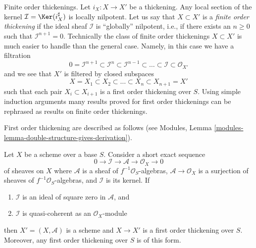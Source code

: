 \noindent
Finite order thickenings. Let $i_X : X \to X'$ be a thickening.
Any local section of the kernel
$\mathcal{I} = \Ker(i_X^\sharp)$ is locally nilpotent.
Let us say that $X \subset X'$ is a {\it finite order thickening}
if the ideal sheaf $\mathcal{I}$ is ``globally'' nilpotent, i.e.,
if there exists an $n \geq 0$ such that $\mathcal{I}^{n + 1} = 0$.
Technically the class of finite order thickenings $X \subset X'$
is much easier to handle than the general case.
Namely, in this case we have a filtration
$$
0 = \mathcal{I}^{n + 1} \subset
\mathcal{I}^n \subset
\mathcal{I}^{n - 1} \subset \ldots \subset
\mathcal{I} \subset \mathcal{O}_{X'}
$$
and we see that $X'$ is filtered by closed subspaces
$$
X = X_1 \subset X_2 \subset \ldots \subset X_n \subset X_{n + 1} = X'
$$
such that each pair $X_i \subset X_{i + 1}$ is a first order thickening
over $S$. Using simple induction arguments many results proved for first order
thickenings can be rephrased as results on finite order thickenings.

\medskip\noindent
First order thickening are described as follows (see
Modules, Lemma \ref{modules-lemma-double-structure-gives-derivation}).

\begin{lemma}
\label{lemma-first-order-thickening}
Let $X$ be a scheme over a base $S$. Consider a short exact sequence
$$
0 \to \mathcal{I} \to \mathcal{A} \to \mathcal{O}_X \to 0
$$
of sheaves on $X$ where $\mathcal{A}$ is a sheaf of
$f^{-1}\mathcal{O}_S$-algebras,
$\mathcal{A} \to \mathcal{O}_X$ is a surjection
of sheaves of $f^{-1}\mathcal{O}_S$-algebras, and $\mathcal{I}$ is its kernel.
If
\begin{enumerate}
\item $\mathcal{I}$ is an ideal of square zero in $\mathcal{A}$, and
\item $\mathcal{I}$ is quasi-coherent as an $\mathcal{O}_X$-module
\end{enumerate}
then $X' = (X, \mathcal{A})$ is a scheme and $X \to X'$ is a first
order thickening over $S$. Moreover, any first order thickening over
$S$ is of this form.
\end{lemma}

